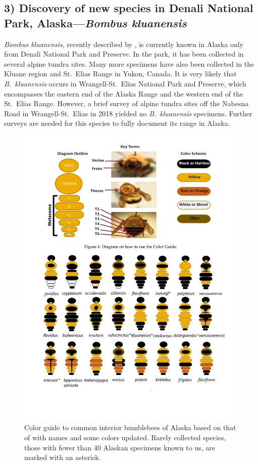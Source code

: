 \begin{multicols}{2}
\subsection{3) Discovery of new species in Denali National Park, Alaska---\textit{Bombus kluanensis}}

\textit{Bombus kluanensis}, recently described by \citet{Williamsetal2016}, is currently known in Alaska only from Denali National Park and Preserve. In the park, it has been collected in several alpine tundra sites. Many more specimens have also been collected in the Kluane region and St.\ Elias Range in Yukon, Canada. It is very likely that \textit{B.\ kluanensis} occurs in Wrangell-St.\ Elias National Park and Preserve, which encompasses the eastern end of the Alaska Range and the western end of the St.\ Elias Range. However, a brief survey of alpine tundra sites off the Nabesna Road in Wrangell-St.\ Elias in 2018 yielded no \textit{B.\ kluanensis} specimens. Further surveys are needed for this species to fully document its range in Alaska.

\end{multicols}
\begin{figure}[H]
\begin{center}
\includegraphics[width=\textwidth]{img/bumblebee_guide.jpg}
\caption{Color guide to common interior bumblebees of Alaska based on that of \citet{Pampell2010} with names and some colors updated. Rarely collected species, those with fewer than 40 Alaskan specimens known to us, are marked with an asterisk.}
\label{color_guide}
\end{center}
\end{figure} 
